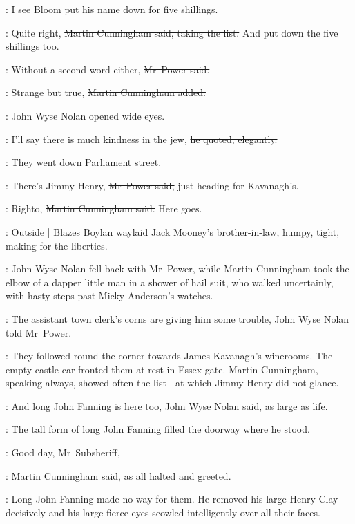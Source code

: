 \johnwyse:
I see Bloom put his name down for five shillings.

\cunningham:
Quite right,
\sout{Martin Cunningham said,
taking the list.}
And put down the
five shillings too.

\power:
Without a second word either,
\sout{Mr~Power said.}

\cunningham:
Strange but true,
\sout{Martin Cunningham added.}

:
John Wyse Nolan opened wide eyes.

\johnwyse:
I'll say there is much kindness in the jew,%
\sout{he quoted, elegantly.}

:
They went down Parliament street.

\power:
There's Jimmy Henry,
\sout{Mr~Power said,}
just heading for Kavanagh's.

\cunningham:
Righto,
\sout{Martin Cunningham said.}
Here goes.

\begin{interject}
    :
    Outside  |
    Blazes Boylan waylaid Jack Mooney's brother-in-law,
    humpy, tight,
    making for the liberties.
\end{interject}

:
John Wyse Nolan fell back with Mr~Power,
while Martin Cunningham took the elbow
of a dapper little man in a shower of hail suit,
who walked uncertainly,
with hasty steps past Micky Anderson's watches.

\johnwyse:
The assistant town clerk's corns are giving him some trouble,
\sout{John Wyse Nolan told Mr~Power.}%

:
They followed round the corner
towards James Kavanagh's winerooms.
The empty castle car fronted them at rest in Essex gate.
Martin Cunningham,
speaking always,
showed often the list |
at which Jimmy Henry did not glance.

\johnwyse:
And long John Fanning is here too,
\sout{John Wyse Nolan said,}
as large as life.

:
The tall form of long John Fanning
filled the doorway where he stood.

\cunningham:
Good day, Mr~Subsheriff,

:
Martin Cunningham said,
as all halted and greeted.%

:
Long John Fanning made no way for them.
He removed his large Henry Clay decisively
and his large fierce eyes scowled intelligently over all their faces.

